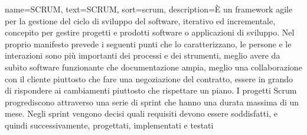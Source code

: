 {
	name={SCRUM},
	text=SCRUM,
	sort=scrum,
	description={È un framework agile per la gestione del ciclo di sviluppo del software, iterativo ed incrementale, concepito per gestire progetti e prodotti software o applicazioni di sviluppo. Nel proprio manifesto prevede i seguenti punti che lo caratterizzano, le persone e le interazioni sono più importanti dei processi e dei strumenti, meglio avere da subito software funzionante che documentazione ampia, meglio una collaborazione con il cliente piuttosto che fare una negoziazione del contratto, essere in grando di rispondere ai cambiamenti piuttosto che rispettare un piano. 
	I progetti Scrum progrediscono attraverso una serie di sprint che hanno una durata massima di un mese. Negli sprint vengono decisi quali requisiti devono essere soddisfatti, e quindi successivamente, progettati, implementati e testati}
}
\begin{comment}
\newglossaryentry{e2eg}
{
	name=\glslink{test e2e}{E2E},
	text=Test End to End,
	sort=test End to End,
	description={Con il termine test end-to-end (end-to-end testing) si intende quell’attività di testing dell’interfaccia grafica vista dagli utenti del programma dall’inizio fino alla fine. In altre parole rappresenta una metodologia utilizzata per verificare se il flusso di un’applicazione si sta comportando come progettato dall’inizio fino alla fine senza che vengano rilevati dei errori che andrebbero a inficiare sulla qualità dell’applicazione stessa}
}
\end{comment}
